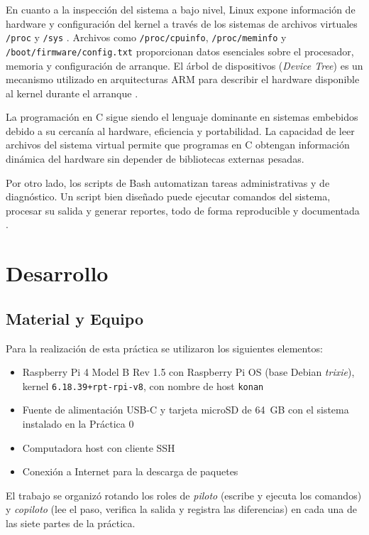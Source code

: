 \documentclass[conference]{IEEEtran}
\begin{document}
En cuanto a la inspección del sistema a bajo nivel, Linux expone información de hardware y configuración del kernel a través de los sistemas de archivos virtuales \texttt{/proc} y \texttt{/sys} \cite{linux_proc}. Archivos como \texttt{/proc/cpuinfo}, \texttt{/proc/meminfo} y \texttt{/boot/firmware/config.txt} proporcionan datos esenciales sobre el procesador, memoria y configuración de arranque. El árbol de dispositivos (\textit{Device Tree}) es un mecanismo utilizado en arquitecturas ARM para describir el hardware disponible al kernel durante el arranque \cite{rpi_docs}.

La programación en C sigue siendo el lenguaje dominante en sistemas embebidos debido a su cercanía al hardware, eficiencia y portabilidad. La capacidad de leer archivos del sistema virtual permite que programas en C obtengan información dinámica del hardware sin depender de bibliotecas externas pesadas.

Por otro lado, los scripts de Bash automatizan tareas administrativas y de diagnóstico. Un script bien diseñado puede ejecutar comandos del sistema, procesar su salida y generar reportes, todo de forma reproducible y documentada \cite{bash_guide}.

\section{Desarrollo}

\subsection{Material y Equipo}
Para la realización de esta práctica se utilizaron los siguientes elementos:
\begin{itemize}
	\item Raspberry Pi 4 Model B Rev 1.5 con Raspberry Pi OS (base Debian \textit{trixie}), kernel \texttt{6.18.39+rpt-rpi-v8}, con nombre de host \texttt{konan}
	\item Fuente de alimentación USB-C y tarjeta microSD de 64~GB con el sistema instalado en la Práctica 0
	\item Computadora host con cliente SSH
	\item Conexión a Internet para la descarga de paquetes
\end{itemize}

El trabajo se organizó rotando los roles de \textit{piloto} (escribe y ejecuta los comandos) y \textit{copiloto} (lee el paso, verifica la salida y registra las diferencias) en cada una de las siete partes de la práctica.
\end{document}
